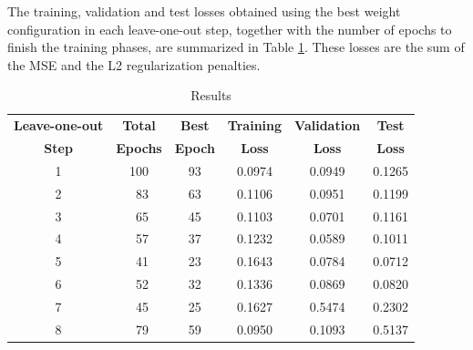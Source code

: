 \documentclass[conference]{IEEEtran}
\begin{document}
The training, validation and test losses obtained using the best weight configuration in each leave-one-out step, together with the number of epochs to finish the training phases, are summarized in Table \ref{tab:results}.
These losses are the sum of the MSE and the L2 regularization penalties.

\begin{table}[htbp]
\begin{center}
\caption{Results}
\begin{tabular}{|c|c c| c c c|}
\hline
\textbf{Leave-one-out} & \textbf{Total} & \textbf{Best} & \textbf{Training} & \textbf{Validation} & \textbf{Test} \\
\textbf{Step} & \textbf{Epochs} & \textbf{Epoch} & \textbf{Loss} & \textbf{Loss} & \textbf{Loss} \\
\hline
1 &  100 & 93 & 0.0974 & 0.0949 & 0.1265 \\ %
2 & \ 83 & 63 & 0.1106 & 0.0951 & 0.1199 \\ %
3 & \ 65 & 45 & 0.1103 & 0.0701 & 0.1161 \\ %
4 & \ 57 & 37 & 0.1232 & 0.0589 & 0.1011 \\ %
5 & \ 41 & 23 & 0.1643 & 0.0784 & 0.0712 \\ %
6 & \ 52 & 32 & 0.1336 & 0.0869 & 0.0820 \\ %
7 & \ 45 & 25 & 0.1627 & 0.5474 & 0.2302 \\ %
8 & \ 79 & 59 & 0.0950 & 0.1093 & 0.5137 \\ \hline
\end{tabular}
\label{tab:results}
\end{center}
\end{table}
\end{document}
